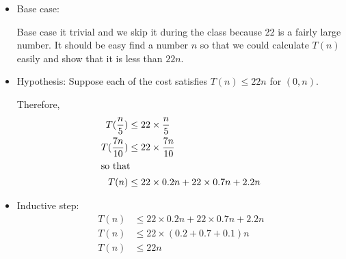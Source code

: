 \documentclass[en,hazy,blue,screen,14pt]{elegantnote}
\begin{document}
\begin{itemize}
\item Base case:

    Base case it trivial and we skip it during the class because 22 is a 
fairly large number. It should be easy find a number $n$ so that we could 
calculate $T(n)$ easily and show that it is less than $22n$.

\item Hypothesis: Suppose each of the cost satisfies $T(n) \le 22n$ for $(0, 
n)$. 

Therefore, 
    \begin{align*}
    T(\frac{n}{5}) &\le 22 \times \frac{n}{5}\\
    T(\frac{7n}{10}) &\le 22 \times \frac{7n}{10}\\
    \intertext{so that}
    T(n) &\le 22 \times 0.2 n + 22 \times 0.7 n + 2.2n
    \end{align*}
\item Inductive step:
    \begin{align*}
    T(n) &\le 22 \times 0.2 n + 22 \times 0.7 n + 2.2n\\
    T(n) &\le 22 \times (0.2 + 0.7 + 0.1)n\\
    T(n) &\le 22n
    \end{align*}

\end{itemize}
\end{document}
